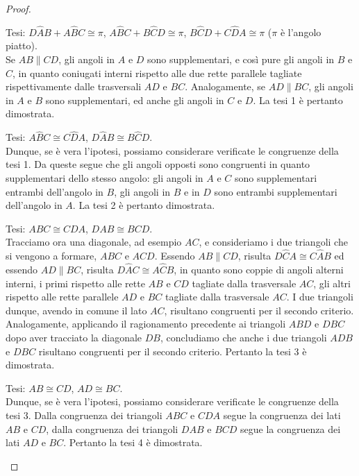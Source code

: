\begin{proof}~\\
  \begin{enumerate*}
    
    \item Tesi: $D\widehat{A}B+A\widehat{B}C\cong\pi$, 
    $A\widehat{B}C+B\widehat{C}D\cong\pi$, 
    $B\widehat{C}D+C\widehat{D}A\cong\pi$ ($\pi$ è l'angolo piatto).\\
    Se $AB\parallel CD$, gli angoli in $A$ e $D$ sono supplementari, e 
    così pure gli angoli in $B$ e $C$, in quanto coniugati interni 
    rispetto alle due rette parallele tagliate rispettivamente dalle 
    trasversali $AD$ e $BC$. Analogamente, se $AD\parallel BC$, gli 
    angoli in $A$ e $B$ sono supplementari, ed anche gli angoli in $C$ e 
    $D$. La tesi 1 è pertanto dimostrata.
    
    \item Tesi: $A\widehat{B}C\cong C\widehat{D}A$, $D\widehat{A}B\cong 
    B\widehat{C}D$.\\
    Dunque, se è vera l'ipotesi, possiamo considerare verificate le 
    congruenze della tesi 1. Da queste segue che gli angoli opposti sono 
    congruenti in quanto supplementari dello stesso angolo: gli angoli in 
    $A$ e $C$ sono supplementari entrambi dell'angolo in $B$, gli angoli 
    in $B$ e in $D$ sono entrambi supplementari dell'angolo in $A$. La 
    tesi 2 è pertanto dimostrata.
    
    \item Tesi: $ABC\cong CDA$, $DAB\cong BCD$.\\
    Tracciamo ora una diagonale, ad esempio $AC$, e consideriamo i due 
    triangoli che si vengono a formare, $ABC$ e $ACD$. Essendo 
    $AB\parallel CD$, risulta $D\widehat{C}A\cong C\widehat{A}B$ ed 
    essendo $AD\parallel BC$, risulta $D\widehat{A}C\cong A\widehat{C}B$, 
    in quanto sono coppie di angoli alterni interni, i primi rispetto 
    alle rette $AB$ e $CD$ tagliate dalla trasversale $AC$, gli altri 
    rispetto alle rette parallele $AD$ e $BC$ tagliate dalla trasversale 
    $AC$. I due triangoli dunque, avendo in comune il lato $AC$, 
    risultano congruenti per il secondo criterio. Analogamente, applicando 
    il ragionamento precedente ai triangoli $ABD$ e $DBC$ dopo aver 
    tracciato la diagonale $DB$, concludiamo che anche i due triangoli 
    $ADB$ e $DBC$ risultano congruenti per il secondo criterio. Pertanto 
    la tesi 3 è dimostrata.
    
    \item Tesi: $AB\cong CD$, $AD\cong BC$.\\
    Dunque, se è vera l'ipotesi, possiamo considerare verificate le 
    congruenze della tesi 3. Dalla congruenza dei triangoli $ABC$ e $CDA$ 
    segue la congruenza dei lati $AB$ e $CD$, dalla congruenza dei 
    triangoli $DAB$ e $BCD$ segue la congruenza dei lati $AD$ e $BC$. 
    Pertanto la tesi 4 è dimostrata.
    

\end{enumerate*}
\end{proof}
